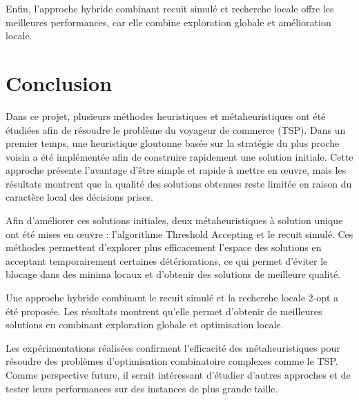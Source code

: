 \documentclass[11pt,a4paper]{article}
\begin{document}
	Enfin, l'approche hybride combinant recuit simulé et recherche locale offre les meilleures performances, car elle combine exploration globale et amélioration locale.
	
	\section{Conclusion}
	
	Dans ce projet, plusieurs méthodes heuristiques et métaheuristiques ont été étudiées afin de résoudre le problème du voyageur de commerce (TSP). Dans un premier temps, une heuristique gloutonne basée sur la stratégie du plus proche voisin a été implémentée afin de construire rapidement une solution initiale. Cette approche présente l’avantage d’être simple et rapide à mettre en œuvre, mais les résultats montrent que la qualité des solutions obtenues reste limitée en raison du caractère local des décisions prises.
	
	Afin d’améliorer ces solutions initiales, deux métaheuristiques à solution unique ont été mises en œuvre : l’algorithme Threshold Accepting et le recuit simulé. Ces méthodes permettent d’explorer plus efficacement l’espace des solutions en acceptant temporairement certaines détériorations, ce qui permet d’éviter le blocage dans des minima locaux et d’obtenir des solutions de meilleure qualité.
	
	Une approche hybride combinant le recuit simulé et la recherche locale 2-opt a été proposée. Les résultats montrent qu’elle permet d’obtenir de meilleures solutions en combinant exploration globale et optimisation locale.
	
	Les expérimentations réalisées confirment l’efficacité des métaheuristiques pour résoudre des problèmes d’optimisation combinatoire complexes comme le TSP. Comme perspective future, il serait intéressant d’étudier d’autres approches et de tester leurs performances sur des instances de plus grande taille.
	
\end{document}
